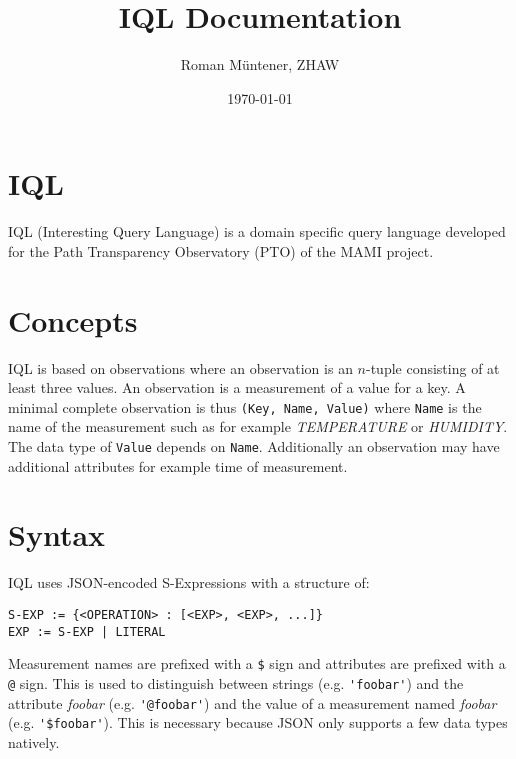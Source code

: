 \documentclass[a4paper]{article}
\begin{document}
\setlength\parindent{0pt}

\title{IQL Documentation}
\author{Roman M\"untener, ZHAW}
\date{\today}

\maketitle


\section{IQL}

IQL (Interesting Query Language) is a domain specific query language
developed for the Path Transparency Observatory (PTO) of the MAMI
project.

\section{Concepts}

IQL is based on observations where an observation is an $n$-tuple
consisting of at least three values. An observation is a measurement
of a value for a key.  A minimal complete observation is thus
\verb|(Key, Name, Value)| where \verb|Name| is the name of the
measurement such as for example \textit{TEMPERATURE} or
\textit{HUMIDITY}. The data type of \verb|Value| depends on
\verb|Name|. Additionally an observation may have additional
attributes for example time of measurement.

\section{Syntax}

IQL uses JSON-encoded S-Expressions with a structure of:

\begin{verbatim}
S-EXP := {<OPERATION> : [<EXP>, <EXP>, ...]}
EXP := S-EXP | LITERAL
\end{verbatim}

Measurement names are prefixed with a
\verb|$| sign and attributes are prefixed with a \verb|@| sign. This
is used to distinguish between strings (e.g. \verb|'foobar'|) and the
attribute \textit{foobar} (e.g. \verb|'@foobar'|) and the value of a
measurement named \textit{foobar} (e.g. \verb|'$foobar'|). This is
necessary because JSON only supports a few data types natively.
\end{document}
